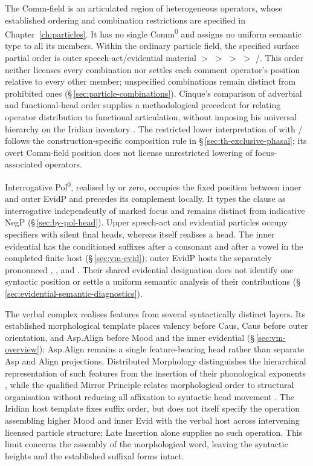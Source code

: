 The Comm-field is an articulated region of heterogeneous operators, whose
established ordering and combination restrictions are specified in
Chapter~\ref{ch:particles}. It has no single Comm\textsuperscript{0} and
assigns no uniform semantic type to all its members. Within the ordinary
particle field, the specified surface partial order is outer
speech-act/evidential material $>$  $>$  $>$ 
$>$ /. This order neither licenses every combination nor
settles each comment operator's position relative to every other member;
unspecified combinations remain distinct from prohibited ones
(§\,\ref{sec:particle-combinations}). Cinque's comparison of adverbial and
functional-head order supplies a methodological precedent for relating
operator distribution to functional articulation, without imposing his
universal hierarchy on the Iridian inventory \cite[chs.~3--4]{cinque1999}.
The restricted lower interpretation of  with /
follows the construction-specific composition rule in
§\,\ref{sec:th-exclusive-phasal}; its overt Comm-field position does not
license unrestricted lowering of focus-associated operators.

Interrogative Pol\textsuperscript{0}, realised by  or zero,
occupies the fixed position between inner and outer EvidP and precedes its
complement locally. It types the clause as interrogative independently of
marked focus and remains distinct from indicative NegP
(§\,\ref{sec:by-pol-head}). Upper speech-act and evidential particles
occupy specifiers with silent final heads, whereas  itself
realises a head. The inner evidential has the conditioned suffixes
 after a consonant and  after a vowel in the completed
finite host (§\,\ref{sec:vm-evid}); outer EvidP hosts the separately
pronounced , ,  and .
Their shared evidential designation does not identify one syntactic position
or settle a uniform semantic analysis of their contributions
(§\,\ref{sec:evidential-semantic-diagnostics}).

The verbal complex realises features from several syntactically distinct
layers. Its established morphological template places valency before Caus,
Caus before outer orientation, and Asp.Align before Mood and the inner
evidential (§\,\ref{sec:vm-overview}); Asp.Align remains a single
feature-bearing head rather than separate Asp and Align projections.
Distributed Morphology distinguishes the hierarchical representation of
such features from the insertion of their phonological exponents
\cite{hallemarantz1993,embicknoyer2007}, while the qualified Mirror Principle
relates morphological order to structural organisation without reducing all
affixation to syntactic head movement
\cite{baker1985,harley2013b}. The Iridian host template fixes suffix order,
but does not itself specify the operation assembling higher Mood and inner
Evid with the verbal host across intervening licensed particle structure;
Late Insertion alone supplies no such operation. This limit concerns the
assembly of the morphological word, leaving the syntactic heights and the
established suffixal forms intact.

